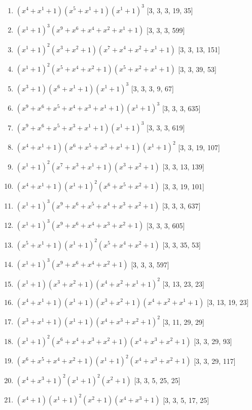 \documentclass[10pt,twocolumn]{article}
\begin{document}
\begin{enumerate}
\item $(x^{4} + x^{1} + 1)(x^{5} + x^{1} + 1)(x^{1} + 1)^{3}$  [3, 3, 3, 19, 35]
\item $(x^{1} + 1)^{3}(x^{9} + x^{6} + x^{4} + x^{2} + x^{1} + 1)$  [3, 3, 3, 599]
\item $(x^{1} + 1)^{2}(x^{3} + x^{2} + 1)(x^{7} + x^{4} + x^{2} + x^{1} + 1)$  [3, 3, 13, 151]
\item $(x^{1} + 1)^{2}(x^{5} + x^{4} + x^{2} + 1)(x^{5} + x^{2} + x^{1} + 1)$  [3, 3, 39, 53]
\item $(x^{3} + 1)(x^{6} + x^{1} + 1)(x^{1} + 1)^{3}$  [3, 3, 3, 9, 67]
\item $(x^{9} + x^{6} + x^{5} + x^{4} + x^{3} + x^{1} + 1)(x^{1} + 1)^{3}$  [3, 3, 3, 635]
\item $(x^{9} + x^{6} + x^{5} + x^{3} + x^{1} + 1)(x^{1} + 1)^{3}$  [3, 3, 3, 619]
\item $(x^{4} + x^{1} + 1)(x^{6} + x^{5} + x^{3} + x^{1} + 1)(x^{1} + 1)^{2}$  [3, 3, 19, 107]
\item $(x^{1} + 1)^{2}(x^{7} + x^{3} + x^{1} + 1)(x^{3} + x^{2} + 1)$  [3, 3, 13, 139]
\item $(x^{4} + x^{1} + 1)(x^{1} + 1)^{2}(x^{6} + x^{5} + x^{2} + 1)$  [3, 3, 19, 101]
\item $(x^{1} + 1)^{3}(x^{9} + x^{6} + x^{5} + x^{4} + x^{3} + x^{2} + 1)$  [3, 3, 3, 637]
\item $(x^{1} + 1)^{3}(x^{9} + x^{6} + x^{4} + x^{3} + x^{2} + 1)$  [3, 3, 3, 605]
\item $(x^{5} + x^{1} + 1)(x^{1} + 1)^{2}(x^{5} + x^{4} + x^{2} + 1)$  [3, 3, 35, 53]
\item $(x^{1} + 1)^{3}(x^{9} + x^{6} + x^{4} + x^{2} + 1)$  [3, 3, 3, 597]
\item $(x^{1} + 1)(x^{3} + x^{2} + 1)(x^{4} + x^{2} + x^{1} + 1)^{2}$  [3, 13, 23, 23]
\item $(x^{4} + x^{1} + 1)(x^{1} + 1)(x^{3} + x^{2} + 1)(x^{4} + x^{2} + x^{1} + 1)$  [3, 13, 19, 23]
\item $(x^{3} + x^{1} + 1)(x^{1} + 1)(x^{4} + x^{3} + x^{2} + 1)^{2}$  [3, 11, 29, 29]
\item $(x^{1} + 1)^{2}(x^{6} + x^{4} + x^{3} + x^{2} + 1)(x^{4} + x^{3} + x^{2} + 1)$  [3, 3, 29, 93]
\item $(x^{6} + x^{5} + x^{4} + x^{2} + 1)(x^{1} + 1)^{2}(x^{4} + x^{3} + x^{2} + 1)$  [3, 3, 29, 117]
\item $(x^{4} + x^{3} + 1)^{2}(x^{1} + 1)^{2}(x^{2} + 1)$  [3, 3, 5, 25, 25]
\item $(x^{4} + 1)(x^{1} + 1)^{2}(x^{2} + 1)(x^{4} + x^{3} + 1)$  [3, 3, 5, 17, 25]

\end{enumerate}
\end{document}
